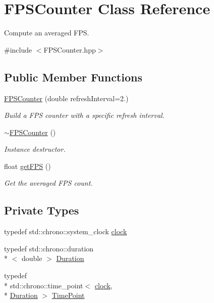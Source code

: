 \hypertarget{classFPSCounter}{\section{F\+P\+S\+Counter Class Reference}
\label{classFPSCounter}
}


Compute an averaged F\+P\+S.  




{\ttfamily \#include $<$F\+P\+S\+Counter.\+hpp$>$}

\subsection*{Public Member Functions}
\begin{DoxyCompactItemize}
\item 
\hyperlink{classFPSCounter_a5302dd56ff08c75f086680163d410f57}{F\+P\+S\+Counter} (double refresh\+Interval=2.)
\begin{DoxyCompactList}\small\item\em Build a F\+P\+S counter with a specific refresh interval. \end{DoxyCompactList}\item 
\hyperlink{classFPSCounter_acaa2539d1af5e6da509f5ce32b13972d}{$\sim$\+F\+P\+S\+Counter} ()
\begin{DoxyCompactList}\small\item\em Instance destructor. \end{DoxyCompactList}\item 
float \hyperlink{classFPSCounter_a2b7e118b610867e4f62b359eb589e65f}{get\+F\+P\+S} ()
\begin{DoxyCompactList}\small\item\em Get the averaged F\+P\+S count. \end{DoxyCompactList}\end{DoxyCompactItemize}
\subsection*{Private Types}
\begin{DoxyCompactItemize}
\item 
typedef std\+::chrono\+::system\+\_\+clock \hyperlink{classFPSCounter_aff42afc3b6d4fd2b4fcdb7579fa48031}{clock}
\item 
typedef std\+::chrono\+::duration\\*
$<$ double $>$ \hyperlink{classFPSCounter_a2cb0edfdff687339a681ce0349febe4b}{Duration}
\item 
typedef \\*
std\+::chrono\+::time\+\_\+point$<$ \hyperlink{classFPSCounter_aff42afc3b6d4fd2b4fcdb7579fa48031}{clock}, \\*
\hyperlink{classFPSCounter_a2cb0edfdff687339a681ce0349febe4b}{Duration} $>$ \hyperlink{classFPSCounter_abdab5df998311505d5b39210eb4e4940}{Time\+Point}
\end{DoxyCompactItemize}

